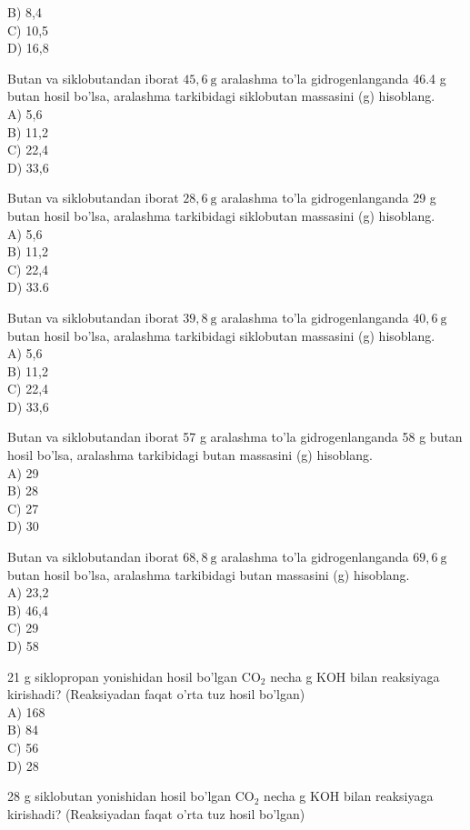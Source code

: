 B) 8,4\\
C) 10,5\\
D) 16,8
  \item Butan va siklobutandan iborat $45,6 \mathrm{~g}$ aralashma to'la gidrogenlanganda 46.4 g butan hosil bo'lsa, aralashma tarkibidagi siklobutan massasini (g) hisoblang.\\
A) 5,6\\
B) 11,2\\
C) 22,4\\
D) 33,6
  \item Butan va siklobutandan iborat $28,6 \mathrm{~g}$ aralashma to'la gidrogenlanganda 29 g butan hosil bo'lsa, aralashma tarkibidagi siklobutan massasini (g) hisoblang.\\
A) 5,6\\
B) 11,2\\
C) 22,4\\
D) 33.6
  \item Butan va siklobutandan iborat $39,8 \mathrm{~g}$ aralashma to'la gidrogenlanganda $40,6 \mathrm{~g}$ butan hosil bo'lsa, aralashma tarkibidagi siklobutan massasini (g) hisoblang.\\
A) 5,6\\
B) 11,2\\
C) 22,4\\
D) 33,6
  \item Butan va siklobutandan iborat 57 g aralashma to'la gidrogenlanganda 58 g butan hosil bo'lsa, aralashma tarkibidagi butan massasini (g) hisoblang.\\
A) 29\\
B) 28\\
C) 27\\
D) 30
  \item Butan va siklobutandan iborat $68,8 \mathrm{~g}$ aralashma to'la gidrogenlanganda $69,6 \mathrm{~g}$ butan hosil bo'lsa, aralashma tarkibidagi butan massasini (g) hisoblang.\\
A) 23,2\\
B) 46,4\\
C) 29\\
D) 58
  \item 21 g siklopropan yonishidan hosil bo'lgan $\mathrm{CO}_{2}$ necha g KOH bilan reaksiyaga kirishadi? (Reaksiyadan faqat o'rta tuz hosil bo'lgan)\\
A) 168\\
B) 84\\
C) 56\\
D) 28
  \item 28 g siklobutan yonishidan hosil bo'lgan $\mathrm{CO}_{2}$ necha g KOH bilan reaksiyaga kirishadi? (Reaksiyadan faqat o'rta tuz hosil bo'lgan)\\
